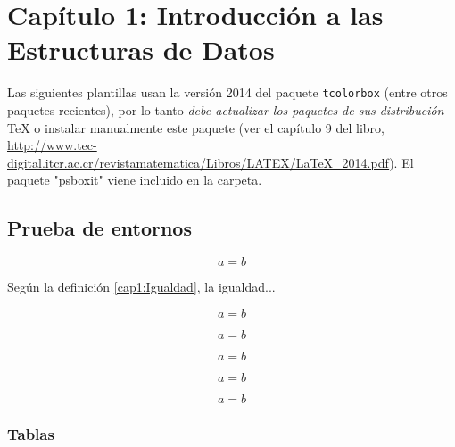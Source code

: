 \chapter{Capítulo 1: Introducción a las Estructuras de Datos}


 \begin{caja}[Advertencia.]
 Las siguientes plantillas usan la versión 2014 del paquete
 \verb+tcolorbox+ (entre otros paquetes recientes),  por lo tanto {\it debe actualizar los paquetes de sus distribución} \TeX{} o instalar manualmente este paquete (ver el capítulo 9 del libro, \url{http://www.tec-digital.itcr.ac.cr/revistamatematica/Libros/LATEX/LaTeX_2014.pdf}). El paquete "psboxit" viene incluido en la carpeta.
 \end{caja}

\section{Prueba de entornos}

\begin{definicion}
  $$a=b$$
\end{definicion}

\bigskip
Según la definición \ref{cap1:Igualdad}, la igualdad...\\

\bigskip
\begin{teorema}
 $$a=b$$
\end{teorema}

\bigskip
\begin{ejemplo}
 $$a=b$$
\end{ejemplo}

\clearpage

\begin{lema}
  $$a=b$$
\end{lema}

\bigskip
\begin{corolario}
 $$a=b$$
\end{corolario}

\bigskip
\begin{caja}
 $$a=b$$
\end{caja}

\subsection{Tablas}

